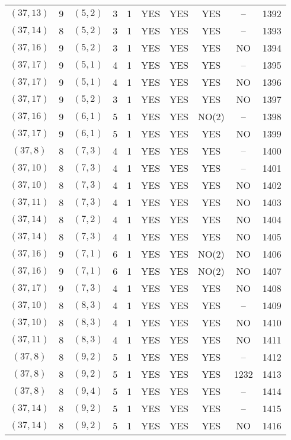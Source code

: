 \begin{longtable}{|c|c|c|c|c|c|c|c|c|c|}
$(37, 13)$ & 9 & $(5, 2)$ & 3 & 1 & YES & YES & YES & -- & 1392\\
$(37, 14)$ & 8 & $(5, 2)$ & 3 & 1 & YES & YES & YES & -- & 1393\\
$(37, 16)$ & 9 & $(5, 2)$ & 3 & 1 & YES & YES & YES & NO & 1394\\
$(37, 17)$ & 9 & $(5, 1)$ & 4 & 1 & YES & YES & YES & -- & 1395\\
$(37, 17)$ & 9 & $(5, 1)$ & 4 & 1 & YES & YES & YES & NO & 1396\\
$(37, 17)$ & 9 & $(5, 2)$ & 3 & 1 & YES & YES & YES & NO & 1397\\
$(37, 16)$ & 9 & $(6, 1)$ & 5 & 1 & YES & YES & NO(2) & -- & 1398\\
$(37, 17)$ & 9 & $(6, 1)$ & 5 & 1 & YES & YES & YES & NO & 1399\\
$(37, 8)$ & 8 & $(7, 3)$ & 4 & 1 & YES & YES & YES & -- & 1400\\
$(37, 10)$ & 8 & $(7, 3)$ & 4 & 1 & YES & YES & YES & -- & 1401\\
$(37, 10)$ & 8 & $(7, 3)$ & 4 & 1 & YES & YES & YES & NO & 1402\\
$(37, 11)$ & 8 & $(7, 3)$ & 4 & 1 & YES & YES & YES & NO & 1403\\
$(37, 14)$ & 8 & $(7, 2)$ & 4 & 1 & YES & YES & YES & NO & 1404\\
$(37, 14)$ & 8 & $(7, 3)$ & 4 & 1 & YES & YES & YES & NO & 1405\\
$(37, 16)$ & 9 & $(7, 1)$ & 6 & 1 & YES & YES & NO(2) & NO & 1406\\
$(37, 16)$ & 9 & $(7, 1)$ & 6 & 1 & YES & YES & NO(2) & NO & 1407\\
$(37, 17)$ & 9 & $(7, 3)$ & 4 & 1 & YES & YES & YES & NO & 1408\\
$(37, 10)$ & 8 & $(8, 3)$ & 4 & 1 & YES & YES & YES & -- & 1409\\
$(37, 10)$ & 8 & $(8, 3)$ & 4 & 1 & YES & YES & YES & NO & 1410\\
$(37, 11)$ & 8 & $(8, 3)$ & 4 & 1 & YES & YES & YES & NO & 1411\\
$(37, 8)$ & 8 & $(9, 2)$ & 5 & 1 & YES & YES & YES & -- & 1412\\
$(37, 8)$ & 8 & $(9, 2)$ & 5 & 1 & YES & YES & YES & 1232 & 1413\\
$(37, 8)$ & 8 & $(9, 4)$ & 5 & 1 & YES & YES & YES & -- & 1414\\
$(37, 14)$ & 8 & $(9, 2)$ & 5 & 1 & YES & YES & YES & -- & 1415\\
$(37, 14)$ & 8 & $(9, 2)$ & 5 & 1 & YES & YES & YES & NO & 1416\\

\end{longtable}
